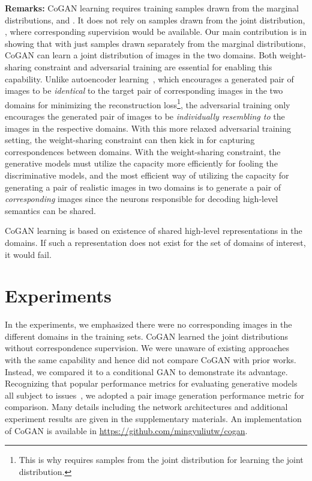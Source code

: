 \documentclass{article}
\begin{document}
{\bf Remarks:} CoGAN learning requires training samples drawn from the marginal distributions,  and . It does not rely on samples drawn from the joint distribution, , where corresponding supervision would be available. Our main contribution is in showing that with just samples drawn separately from the marginal distributions, CoGAN can learn a joint distribution of images in the two domains. Both weight-sharing constraint and adversarial training are essential for enabling this capability. Unlike autoencoder learning~\cite{ngiam2011multimodal}, which encourages a generated pair of images to be {\it identical} to the target pair of corresponding images in the two domains for minimizing the reconstruction loss\footnote{This is why \cite{ngiam2011multimodal} requires samples from the joint distribution for learning the joint distribution.}, the adversarial training only encourages the generated pair of images to be {\it individually resembling to} the images in the respective domains. With this more relaxed adversarial training setting, the weight-sharing constraint can then kick in for capturing correspondences between domains. With the weight-sharing constraint, the generative models must utilize the capacity more efficiently for fooling the discriminative models, and the most efficient way of utilizing the capacity for generating a pair of realistic images in two domains is to generate a pair of {\it corresponding} images since the neurons responsible for decoding high-level semantics can be shared. 

CoGAN learning is based on existence of shared high-level representations in the domains. If such a representation does not exist for the set of domains of interest, it would fail.
 \section{Experiments}\label{sec::expr}

In the experiments, we emphasized there were no corresponding images in the different domains in the training sets. CoGAN learned the joint distributions without correspondence supervision. We were unaware of existing approaches with the same capability and hence did not compare CoGAN with prior works. Instead, we compared it to a conditional GAN to demonstrate its advantage. Recognizing that popular performance metrics for evaluating generative models all subject to issues~\cite{theis2015note}, we adopted a pair image generation performance metric for comparison. Many details including the network architectures and additional experiment results are given in the supplementary materials. An implementation of CoGAN is available in \url{https://github.com/mingyuliutw/cogan}. 
\end{document}
